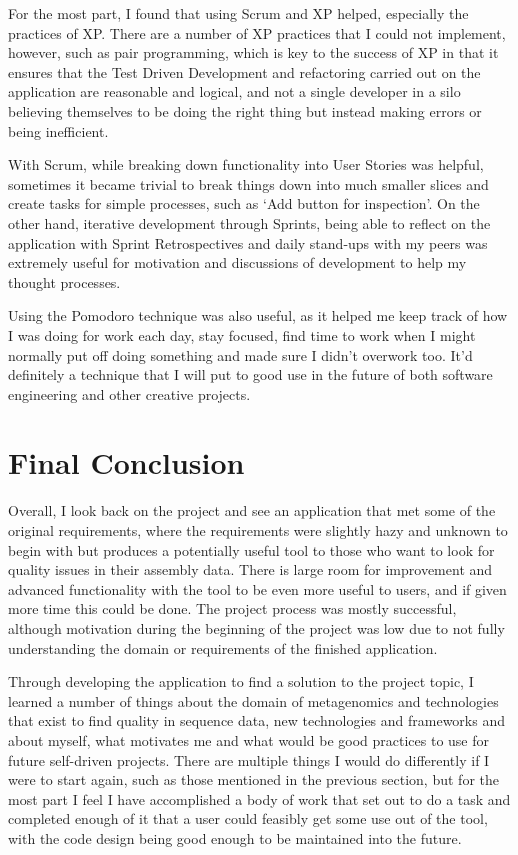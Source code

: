 For the most part, I found that using Scrum and XP helped, especially the practices of XP. There are a number of XP practices that I could not implement, however, such as pair programming, which is key to the success of XP in that it ensures that the Test Driven Development and refactoring carried out on the application are reasonable and logical, and not a single developer in a silo believing themselves to be doing the right thing but instead making errors or being inefficient.

With Scrum, while breaking down functionality into User Stories was helpful, sometimes it became trivial to break things down into much smaller slices and create tasks for simple processes, such as `Add button for inspection'. On the other hand, iterative development through Sprints, being able to reflect on the application with Sprint Retrospectives and daily stand-ups with my peers was extremely useful for motivation and discussions of development to help my thought processes.

Using the Pomodoro technique was also useful, as it helped me keep track of how I was doing for work each day, stay focused, find time to work when I might normally put off doing something and made sure I didn't overwork too. It'd definitely a technique that I will put to good use in the future of both software engineering and other creative projects.

\section{Final Conclusion}
Overall, I look back on the project and see an application that met some of the original requirements, where the requirements were slightly hazy and unknown to begin with but produces a potentially useful tool to those who want to look for quality issues in their assembly data. There is large room for improvement and advanced functionality with the tool to be even more useful to users, and if given more time this could be done. The project process was mostly successful, although motivation during the beginning of the project was low due to not fully understanding the domain or requirements of the finished application.

Through developing the application to find a solution to the project topic, I learned a number of things about the domain of metagenomics and technologies that exist to find quality in sequence data, new technologies and frameworks and about myself, what motivates me and what would be good practices to use for future self-driven projects. There are multiple things I would do differently if I were to start again, such as those mentioned in the previous section, but for the most part I feel I have accomplished a body of work that set out to do a task and completed enough of it that a user could feasibly get some use out of the tool, with the code design being good enough to be maintained into the future.

